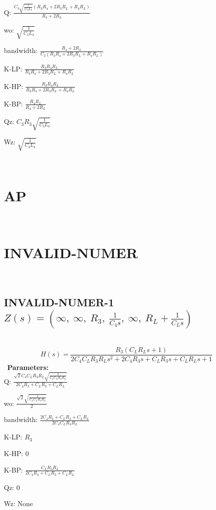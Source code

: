 \documentclass{article}
\begin{document}
Q: $\frac{C_{3} \sqrt{\frac{1}{C_{3} L_{3}}} \left(R_{3} R_{4} + 2 R_{3} R_{L} + R_{4} R_{L}\right)}{R_{4} + 2 R_{L}}$\ 

wo: $\sqrt{\frac{1}{C_{3} L_{3}}}$\ 

bandwidth: $\frac{R_{4} + 2 R_{L}}{C_{3} \left(R_{3} R_{4} + 2 R_{3} R_{L} + R_{4} R_{L}\right)}$\ 

K-LP: $\frac{R_{3} R_{4} R_{L}}{R_{3} R_{4} + 2 R_{3} R_{L} + R_{4} R_{L}}$\ 

K-HP: $\frac{R_{3} R_{4} R_{L}}{R_{3} R_{4} + 2 R_{3} R_{L} + R_{4} R_{L}}$\ 

K-BP: $\frac{R_{4} R_{L}}{R_{4} + 2 R_{L}}$\ 

Qz: $C_{3} R_{3} \sqrt{\frac{1}{C_{3} L_{3}}}$\ 

Wz: $\sqrt{\frac{1}{C_{3} L_{3}}}$\ 

\ 

\section{AP}\ 
\section{INVALID-NUMER}\ 
\subsection{INVALID-NUMER-1 $Z(s) = \left( \infty, \  \infty, \  R_{3}, \  \frac{1}{C_{4} s}, \  \infty, \  R_{L} + \frac{1}{C_{L} s}\right)$ } \ 
\textbf{\[H(s) = \frac{R_{3} \left(C_{L} R_{L} s + 1\right)}{2 C_{4} C_{L} R_{3} R_{L} s^{2} + 2 C_{4} R_{3} s + C_{L} R_{3} s + C_{L} R_{L} s + 1}\] } \ 
\textbf{Parameters:}\\ 

Q: $\frac{\sqrt{2} C_{4} C_{L} R_{3} R_{L} \sqrt{\frac{1}{C_{4} C_{L} R_{3} R_{L}}}}{2 C_{4} R_{3} + C_{L} R_{3} + C_{L} R_{L}}$\ 

wo: $\frac{\sqrt{2} \sqrt{\frac{1}{C_{4} C_{L} R_{3} R_{L}}}}{2}$\ 

bandwidth: $\frac{2 C_{4} R_{3} + C_{L} R_{3} + C_{L} R_{L}}{2 C_{4} C_{L} R_{3} R_{L}}$\ 

K-LP: $R_{3}$\ 

K-HP: $0$\ 

K-BP: $\frac{C_{L} R_{3} R_{L}}{2 C_{4} R_{3} + C_{L} R_{3} + C_{L} R_{L}}$\ 

Qz: $0$\ 

Wz: $\text{None}$\ 
\end{document}
